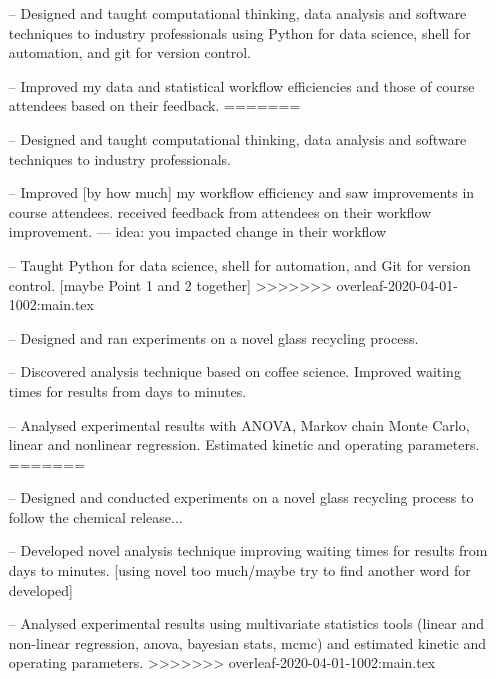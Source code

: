 \documentclass[10pt,a4paper]{altacv}
\begin{document}
\begin{itemize}
<<<<<<< HEAD:cv.tex
    \setlength{\itemindent}{0.3em}
    \item[--]   \small{Designed and taught computational thinking, 
    data analysis and software techniques to industry professionals using
    Python for data science, shell for automation, and git for version
    control.}
    \item[--]   \small{Improved my data and statistical workflow 
    efficiencies and those of course attendees based on their feedback.}
=======
    \setlength{\itemindent}{0.5em}
    \item[--]   \small{Designed and taught computational thinking, data analysis and software techniques to industry professionals.}
    \item[--]   \small{Improved [by how much] my workflow efficiency and saw improvements in course attendees. received feedback from attendees on their workflow improvement. --- idea: you impacted change in their workflow}
    \item[--]   \small{Taught Python for data science, shell for automation, and Git for version control. [maybe Point 1 and 2 together]}
>>>>>>> overleaf-2020-04-01-1002:main.tex
\end{itemize}
\divider\smallskip

\begin{itemize}
<<<<<<< HEAD:cv.tex
    \setlength{\itemindent}{0.3em}
    \item[--]   \small{Designed and ran experiments on a novel glass 
    recycling process.}
    \item[--]   \small{Discovered analysis technique based on 
    coffee science. Improved waiting times for results from days to minutes.}
    \item[--]   \small{Analysed experimental results with ANOVA, Markov chain Monte
    Carlo, linear and nonlinear regression. Estimated kinetic and operating parameters.}
=======
    \setlength{\itemindent}{0.5em}
    \item[--]   \small{Designed and conducted experiments on a novel glass recycling process to follow the chemical release...}
    \item[--]   \small{Developed novel analysis technique improving waiting times for results from days to minutes. [using novel too much/maybe try to find another word for developed]}
    \item[--]   \small{Analysed experimental results using multivariate statistics tools (linear and non-linear regression, anova, bayesian stats, mcmc) and estimated kinetic and operating parameters.}
>>>>>>> overleaf-2020-04-01-1002:main.tex
\end{itemize}
\divider\smallskip
\end{document}
